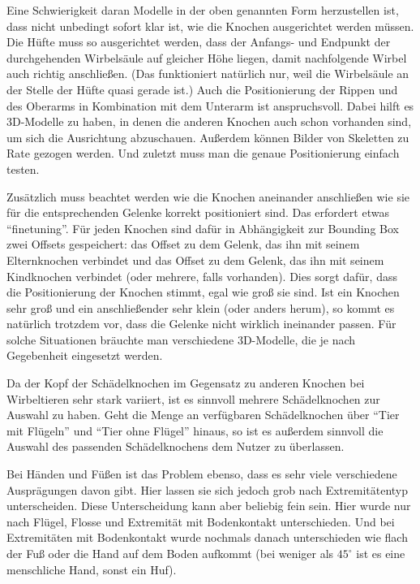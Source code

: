 Eine Schwierigkeit daran Modelle in der oben genannten Form herzustellen ist, dass nicht unbedingt sofort klar ist, wie die Knochen ausgerichtet werden müssen. Die Hüfte muss \zb so ausgerichtet werden, dass der Anfangs- und Endpunkt der durchgehenden Wirbelsäule auf gleicher Höhe liegen, damit nachfolgende Wirbel auch richtig anschließen. (Das funktioniert natürlich nur, weil die Wirbelsäule an der Stelle der Hüfte quasi gerade ist.) 
Auch die Positionierung der Rippen und des Oberarms in Kombination mit dem Unterarm ist anspruchsvoll. Dabei hilft es 3D-Modelle zu haben, in denen die anderen Knochen auch schon vorhanden sind, um sich die Ausrichtung abzuschauen. Außerdem können Bilder von Skeletten zu Rate gezogen werden. Und zuletzt muss man die genaue Positionierung einfach testen.

Zusätzlich muss beachtet werden wie die Knochen aneinander anschließen \bzw wie sie für die entsprechenden Gelenke korrekt positioniert sind. Das erfordert etwas "`finetuning"'. Für jeden Knochen sind dafür in Abhängigkeit zur Bounding Box zwei Offsets gespeichert: das Offset zu dem Gelenk, das ihn mit seinem Elternknochen verbindet und das Offset zu dem Gelenk, das ihn mit seinem Kindknochen verbindet (oder mehrere, falls vorhanden). Dies sorgt dafür, dass die Positionierung der Knochen stimmt, egal wie groß sie sind. Ist ein Knochen sehr groß und ein anschließender sehr klein (oder anders herum), so kommt es natürlich trotzdem vor, dass die Gelenke nicht wirklich ineinander passen. Für solche Situationen bräuchte man verschiedene 3D-Modelle, die je nach Gegebenheit eingesetzt werden.

Da der Kopf \bzw der Schädelknochen im Gegensatz zu anderen Knochen bei Wirbeltieren sehr stark variiert, ist es sinnvoll mehrere Schädelknochen zur Auswahl zu haben. Geht die Menge an verfügbaren Schädelknochen über "`Tier mit Flügeln"' und "`Tier ohne Flügel"' hinaus, so ist es außerdem sinnvoll die Auswahl des passenden Schädelknochens dem Nutzer zu überlassen.

Bei Händen und Füßen ist das Problem ebenso, dass es sehr viele verschiedene Ausprägungen davon gibt. Hier lassen sie sich jedoch grob nach Extremitätentyp unterscheiden. Diese Unterscheidung kann aber beliebig fein sein. Hier wurde nur nach Flügel, Flosse  und Extremität mit Bodenkontakt unterschieden. Und bei Extremitäten mit Bodenkontakt wurde nochmals danach unterschieden wie flach der Fuß oder die Hand auf dem Boden aufkommt (bei weniger als $45^\circ$ ist es eine menschliche Hand, sonst ein Huf). 

